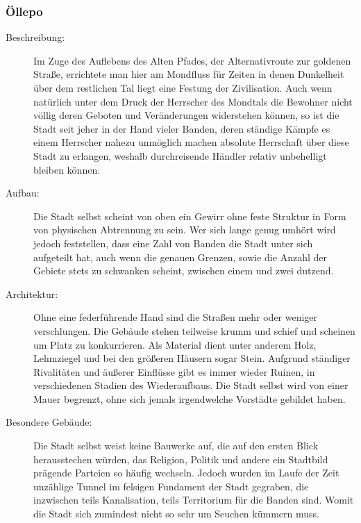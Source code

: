 \documentclass[a4paper,12pt,oneside]{book}
\begin{document}
\subsubsection{Öllepo}
\begin{description}
\item[Beschreibung:]Im Zuge des Auflebens des Alten Pfades, der Alternativroute zur goldenen Straße, errichtete man hier am Mondfluss für Zeiten in denen Dunkelheit über dem restlichen Tal liegt eine Festung der Zivilisation. Auch wenn natürlich unter dem Druck der Herrscher des Mondtals die Bewohner nicht völlig deren Geboten und Veränderungen widerstehen können, so ist die Stadt seit jeher in der Hand vieler Banden, deren ständige Kämpfe es einem Herrscher nahezu unmöglich machen absolute Herrschaft über diese Stadt zu erlangen, weshalb durchreisende Händler relativ unbehelligt bleiben können.
\item[Aufbau:]Die Stadt selbst scheint von oben ein Gewirr ohne feste Struktur in Form von physischen Abtrennung zu sein. Wer sich lange genug umhört wird jedoch feststellen, dass eine Zahl von Banden die Stadt unter sich aufgeteilt hat, auch wenn die genauen Grenzen, sowie die Anzahl der Gebiete stets zu schwanken scheint, zwischen einem und zwei dutzend.
\item[Architektur:]Ohne eine federführende Hand sind die Straßen mehr oder weniger verschlungen. Die Gebäude stehen teilweise krumm und schief und scheinen um Platz zu konkurrieren. Als Material dient unter anderem Holz, Lehmziegel und bei den größeren Häusern sogar Stein. Aufgrund ständiger Rivalitäten und äußerer Einflüsse gibt es immer wieder Ruinen, in verschiedenen Stadien des Wiederaufbaus. Die Stadt selbst wird von einer Mauer begrenzt, ohne sich jemals irgendwelche Vorstädte gebildet haben.
\item[Besondere Gebäude:]Die Stadt selbst weist keine Bauwerke auf, die auf den ersten Blick herausstechen würden, das Religion, Politik und andere ein Stadtbild prägende Parteien so häufig wechseln. Jedoch wurden im Laufe der Zeit unzählige Tunnel im felsigen Fundament der Stadt gegraben, die inzwischen teils Kanalisation, teils Territorium für die Banden sind. Womit die Stadt sich zumindest nicht so sehr um Seuchen kümmern muss. 
\end{description}
\end{document}
